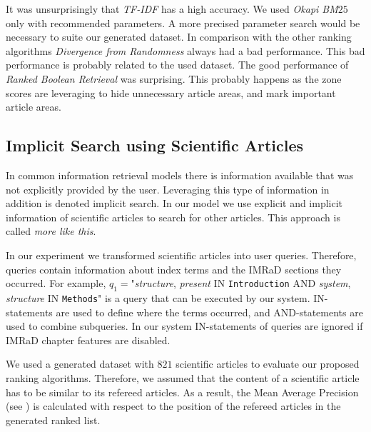 It was unsurprisingly that \textit{TF-IDF} has a high accuracy. We used \textit{Okapi BM$25$} only with recommended parameters. A more precised parameter search would be necessary to suite our generated dataset. In comparison with the other ranking algorithms \textit{Divergence from Randomness} always had a bad performance. This bad performance is probably related to the used dataset. The good performance of \textit{Ranked Boolean Retrieval} was surprising. This probably happens as the zone scores are leveraging to hide unnecessary article areas, and mark important article areas.


\subsection{Implicit Search using Scientific Articles}
\label{sec:implicit_search_results}

In common information retrieval models there is information available that was not explicitly provided by the user. Leveraging this type of information in addition is denoted implicit search. In our model we use explicit and implicit information of scientific articles to search for other articles. This approach is called \textit{more like this}.

In our experiment we transformed scientific articles into user queries. Therefore, queries contain information about index terms and the IMRaD sections they occurred. For example, $q_1=$"\textit{structure}, \textit{present} IN \texttt{Introduction} AND \textit{system}, \textit{structure} IN \texttt{Methods}" is a query that can be executed by our system. IN-statements are used to define where the terms occurred, and AND-statements are used to combine subqueries. In our system IN-statements of queries are ignored if IMRaD chapter features are disabled.

We used a generated dataset with $821$ scientific articles to evaluate our proposed ranking algorithms. Therefore, we assumed that the content of a scientific article has to be similar to its refereed articles. As a result, the Mean Average Precision (see ) is calculated with respect to the position of the refereed articles in the generated ranked list.

